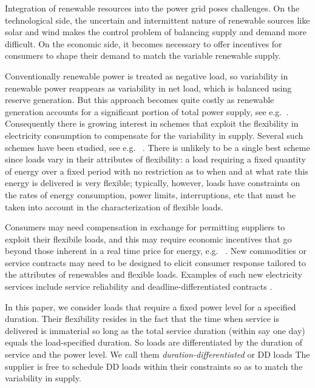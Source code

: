 \documentclass[10pt,draftcls,onecolumn]{IEEEtran}
\newcounter{l1}
\newcounter{l2}
\newcounter{l3}
\begin{document}
Integration of renewable resources into the power grid poses  challenges. On the technological side, the uncertain and intermittent nature of renewable sources like solar and wind makes the control problem of balancing supply and demand more difficult.  On the economic side, it becomes necessary to offer incentives for consumers to shape their demand to match the  variable renewable supply.

Conventionally renewable power is treated as negative load, so variability in renewable power reappears as variability in net load, which is balanced using  reserve generation. But this approach becomes quite costly as renewable generation accounts for a significant portion of total power supply, see e.g.~\cite{CAISO, kirschen2010,negwankowshamey12}.  Consequently there is growing interest in schemes that exploit the flexibility in electricity consumption  to compensate for the variability in supply.  Several such schemes have been studied, see e.g. ~\cite{cal09K, galus2010, papaoren2010, matdyscal12K, anand2012, Paschalidis}.  There is unlikely to be a single best scheme since loads vary in their attributes of flexibility:  a  load  requiring a fixed quantity of energy over a fixed period with no restriction as to when and at what rate this energy is delivered is very flexible; typically, however,  loads  have constraints on the rates of energy consumption, power limits, interruptions, etc that must be taken into account in the characterization of flexible loads. 

Consumers may need  compensation in exchange for permitting suppliers to exploit  their flexibile loads, and this may require  economic incentives that go beyond those inherent in a  real time price for energy,   e.g. ~\cite{tanvar93, pravin2011,negmey12, bitarlow2012}.  New commodities or service contracts may need to be designed to elicit consumer response tailored to the attributes of renewables and flexible loads. Examples of such new electricity services include service reliability and deadline-differentiated contracts  \cite{tanvar93, bitarlow2012}.
 
In this paper, we consider  loads that require a fixed power level for a specified duration.  Their flexibility resides in the fact that the time when service is delivered is immaterial so long as the total service duration (within say one day) equals the load-specified duration.  So loads are differentiated by the duration of service  and the power level.  We call them \textit{duration-differentiated} or DD loads The supplier is free to schedule DD loads within their constraints
so as to match the variability in supply. 
\end{document}
